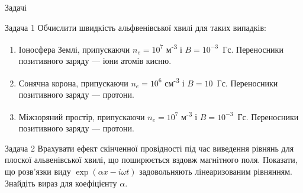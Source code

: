 \documentclass[]{beamer}
\begin{document}
\begin{frame}{Задачі}{}
	\begin{exampleblock}{Задача 1}\justifying
		Обчислити швидкість альфвенівської хвилі для таких випадків:
		\begin{enumerate}
			\item Іоносфера Землі, припускаючи $n_e = 10^7$ м\textsuperscript{-3} і $B = 10^{-3}$~Гс. Переносники позитивного заряду --- іони атомів кисню.
			\item Сонячна корона, припускаючи $n_e = 10^6$ см\textsuperscript{-3} і $B = 10$~Гс. Переносники позитивного заряду --- протони.
			\item Міжзоряний простір, припускаючи  $n_e = 10^7$ м\textsuperscript{-3} і $B = 10^{-3}$~Гс. Переносники позитивного заряду --- протони.
		\end{enumerate}
	\end{exampleblock}
	\begin{exampleblock}{Задача 2}\justifying
		Врахувати ефект скінченної провідності під час виведення рівнянь
		для плоскої альвенівської хвилі, що поширюється вздовж
		магнітного поля. Показати, що розв'язки виду $\exp(\alpha x - i\omega t)$ задовольняють
		лінеаризованим рівнянням. Знайдіть вираз для коефіцієнту $\alpha$.
	\end{exampleblock}
\end{frame}
\end{document}
